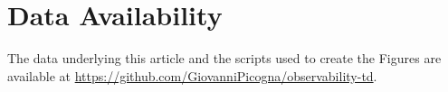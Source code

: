 \documentclass[fleqn,usenatbib]{mnras}
\begin{document}
\section*{Data Availability}
The data underlying this article and the scripts used to create the Figures are available at \href{https://github.com/GiovanniPicogna/observability-td}{https://github.com/GiovanniPicogna/observability-td}.












\bsp	%
\label{lastpage}
\end{document}
